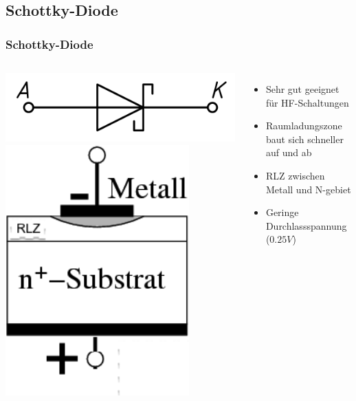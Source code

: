 \subsection*{Schottky-Diode}
\begin{frame}
  \frametitle{Schottky-Diode}
  \begin{columns}[c]
    \begin{center}
      \includegraphics[width=1\textwidth,height=.3\textheight,keepaspectratio]{a05/Diode-Schottky-EN_A-K.png}\\
      \includegraphics[width=0.8\textwidth,height=.6\textheight,keepaspectratio]{a05/AusfuerungsformenSchottkyDiode.png}
      \tiny \hyperlink{refs}{\cite{wm}}
    \end{center}
    \begin{itemize}
      \item Sehr gut geeignet für HF-Schaltungen
      \item Raumladungszone baut sich schneller auf und ab
      \item RLZ zwischen Metall und N-gebiet
      \item Geringe Durchlassspannung ($0.25V$)
    \end{itemize}
  \end{columns}
\end{frame}

